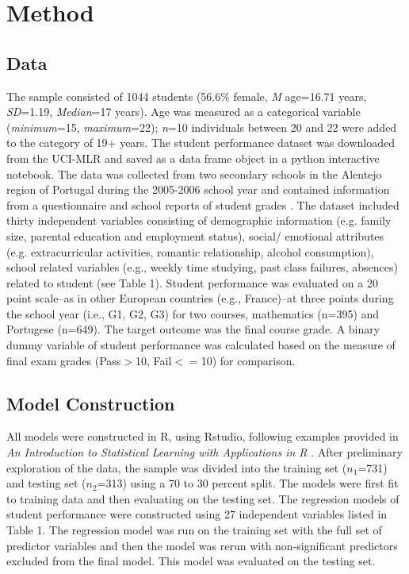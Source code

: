 \documentclass[sigconf]{acmart}
\begin{document}

\section{Method}

\subsection{Data}

The sample consisted of 1044 students (56.6\% female, \textit{M} age=16.71 
years, \textit{SD}=1.19, \textit{Median}=17 years). Age was measured as 
a categorical variable (\textit{minimum}=15, \textit{maximum}=22); 
\textit{n}=10 individuals between 20 and 22 were added to the category of 
19+ years. The student performance dataset was downloaded from the UCI-MLR 
and saved as a data frame object in a python interactive notebook. The data 
was collected from two secondary schools in the Alentejo region of Portugal 
during the 2005-2006 school year and contained information from a 
questionnaire and school reports of student grades \cite{cortez09}. 
The dataset included thirty independent variables consisting of demographic 
information (e.g. family size, parental education and employment status), 
social/ emotional attributes (e.g. extracurricular activities, romantic
relationship, alcohol consumption), school related variables (e.g., weekly 
time studying, past class failures, absences) related to student
(see Table 1). Student performance was evaluated on a 20 point scale--as in 
other European countries (e.g., France)--at three points during the school 
year (i.e., G1, G2, G3) for two courses, mathematics (n=395) and Portugese 
(n=649). The target outcome was the final course grade. A binary dummy
variable of student performance was calculated based on the measure of 
final exam grades (Pass$>$10, Fail$<=$10) for comparison.


\subsection{Model Construction}

All models were constructed in R, using Rstudio, following examples provided 
in \emph{An Introduction to Statistical Learning with Applications in R} 
\cite{jamesetal13}. After preliminary exploration of the data, the sample was 
divided into the training set ($n_1$=731) and testing set ($n_2$=313) using 
a 70 to 30 percent split. The models were first fit to training data and then
evaluating on the testing set. The regression models of student performance
were constructed using 27 independent variables listed in Table 1. The
regression model was run on the training set with the full set of predictor 
variables and then the model was rerun with non-significant predictors 
excluded from the final model. This model was evaluated on the testing set. 
\end{document}
